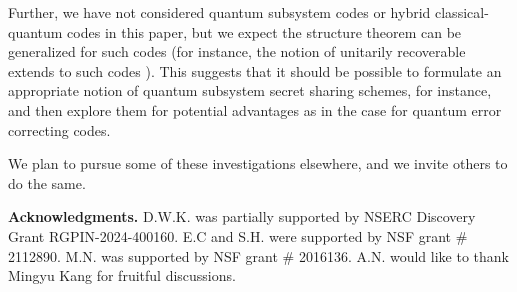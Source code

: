 \documentclass[11pt]{amsart}
\theoremstyle{definition}
\theoremstyle{definition}
\theoremstyle{definition}
\newcommand{\1}{\mathbb{I}}
\begin{document}
Further, we have not considered quantum subsystem codes \cite{kribs2005unified,poulin2005stabilizer,nemec2023quantum} or hybrid classical-quantum codes \cite{nemec2021infinite,dauphinais2024stabilizer} in this paper, but we expect the structure theorem can be generalized for such codes (for instance, the notion of unitarily recoverable extends to such codes \cite{KS06,beny2008algebraic}). This suggests that it should be possible to formulate an appropriate notion of quantum subsystem secret sharing schemes, for instance, and then explore them for potential advantages as in the case for quantum error correcting codes. 

We plan to pursue some of these investigations elsewhere, and we invite others to do the same. 


\vspace{0.1in} 

{\noindent}{\bf Acknowledgments.} D.W.K. was partially supported by NSERC Discovery Grant RGPIN-2024-400160.  E.C and S.H. were supported by NSF grant \#  2112890.  M.N. was supported by NSF grant \# 2016136.  A.N. would like to thank Mingyu Kang for fruitful discussions. 




%

\end{document}
